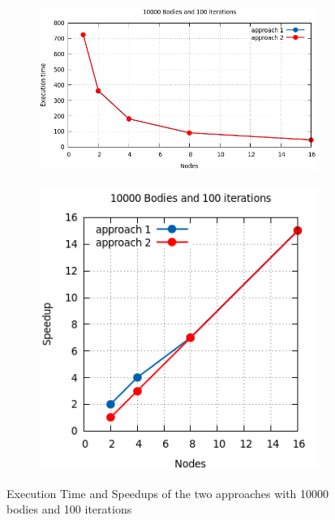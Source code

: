 \documentclass[a4paper]{article}
\begin{document}
\begin{figure}[ht]
\begin{subfigure}{.55\textwidth}
  \centering
  \includegraphics[width=1\linewidth]{results/10000_100_cmp}
\end{subfigure} %
\begin{subfigure}{.35\textwidth}
  \centering
  \includegraphics[width=1\linewidth]{results/10000_100_cmp_sp}
\end{subfigure}
  \caption{Execution Time and Speedups of the two approaches with 10000 bodies and 100 iterations}
  \label{fig:G2}
\end{figure}
\FloatBarrier
\end{document}
